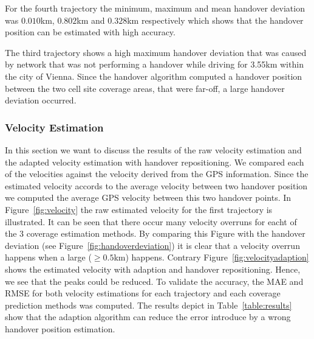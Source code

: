 For the fourth trajectory the minimum, maximum and mean handover deviation was $0.010$km, $0.802$km and $0.328$km respectively which shows that the handover position can be estimated with high accuracy.

The third trajectory shows a high maximum handover deviation that was caused by network that was not performing a handover while driving for 3.55km within the city of Vienna. Since the handover algorithm computed a handover position between the two cell site coverage areas, that were far-off, a large handover deviation occurred.
\subsubsection{Velocity Estimation}
In this section we want to discuss the results of the raw velocity estimation and the adapted velocity estimation with handover repositioning. We compared each of the velocities against the velocity derived from the GPS information. Since the estimated velocity accords to the average velocity between two handover position we computed the average GPS velocity between this two handover points. In Figure~\ref{fig:velocity} the raw estimated velocity for the first trajectory is illustrated. It can be seen that there occur many velocity overruns for eacht of the 3 coverage estimation methods. By comparing this Figure with the handover deviation (see Figure~\ref{fig:handoverdeviation}) it is clear that a velocity overrun happens when a large ($\ge0.5$km) happens. Contrary Figure~\ref{fig:velocityadaption} shows the estimated velocity with adaption and handover repositioning. Hence, we see that the peaks could be reduced. To validate the accuracy, the MAE and RMSE for both velocity estimations for each trajectory and each coverage prediction methods was computed. The results depict in Table~\ref{table:results} show that the adaption algorithm can reduce the error introduce by a wrong handover position estimation.

